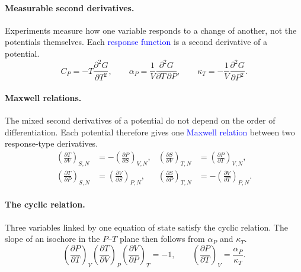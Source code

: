 \paragraph{Measurable second derivatives.}
Experiments measure how one variable responds to a change of another,
not the potentials themselves. Each \textcolor{blue}{response function} is a
second derivative of a potential.
\begin{equation}
    \boxed{C_P=-T\frac{\partial^2G}{\partial T^2},\qquad
    \alpha_P=\frac{1}{V}\frac{\partial^2G}{\partial T\,\partial P},\qquad
    \kappa_T=-\frac{1}{V}\frac{\partial^2G}{\partial P^2}.}
\end{equation}

\paragraph{Maxwell relations.}
The mixed second derivatives of a potential do not depend on the order of
differentiation. Each potential therefore gives one
\textcolor{blue}{Maxwell relation} between two response-type derivatives.
\begin{equation}
    \boxed{
    \begin{aligned}
        \left(\frac{\partial T}{\partial V}\right)_{\!S,N}&=-\left(\frac{\partial P}{\partial S}\right)_{\!V,N}, &
        \left(\frac{\partial S}{\partial V}\right)_{\!T,N}&=\left(\frac{\partial P}{\partial T}\right)_{\!V,N},\\
        \left(\frac{\partial T}{\partial P}\right)_{\!S,N}&=\left(\frac{\partial V}{\partial S}\right)_{\!P,N}, &
        \left(\frac{\partial S}{\partial P}\right)_{\!T,N}&=-\left(\frac{\partial V}{\partial T}\right)_{\!P,N}.
    \end{aligned}}
\end{equation}

\paragraph{The cyclic relation.}
Three variables linked by one equation of state satisfy the cyclic
relation. The slope of an isochore in the $P$--$T$ plane then follows from
$\alpha_P$ and $\kappa_T$.
\begin{equation}
    \boxed{\left(\frac{\partial P}{\partial T}\right)_{\!V}
    \left(\frac{\partial T}{\partial V}\right)_{\!P}
    \left(\frac{\partial V}{\partial P}\right)_{\!T}=-1,
    \qquad
    \left(\frac{\partial P}{\partial T}\right)_{\!V}=\frac{\alpha_P}{\kappa_T}.}
\end{equation}

